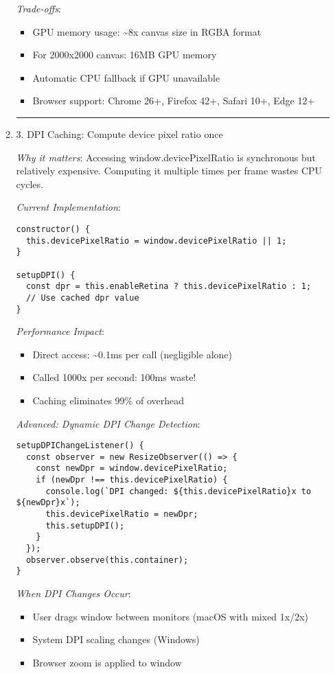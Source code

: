 \documentclass[11pt]{article}
\begin{document}
\begin{enumerate}
\begin{enumerate}
\emph{Trade-offs}:
\begin{itemize}
\item GPU memory usage: \textasciitilde{}8x canvas size in RGBA format
\item For 2000x2000 canvas: 16MB GPU memory
\item Automatic CPU fallback if GPU unavailable
\item Browser support: Chrome 26+, Firefox 42+, Safari 10+, Edge 12+
\end{itemize}

\noindent\rule{\textwidth}{0.5pt}
\item 3. DPI Caching: Compute device pixel ratio once
\label{sec:org31f8089}

\emph{Why it matters}: Accessing window.devicePixelRatio is synchronous but relatively expensive. Computing it multiple times per frame wastes CPU cycles.

\emph{Current Implementation}:
\begin{verbatim}
constructor() {
  this.devicePixelRatio = window.devicePixelRatio || 1;
}

setupDPI() {
  const dpr = this.enableRetina ? this.devicePixelRatio : 1;
  // Use cached dpr value
}
\end{verbatim}

\emph{Performance Impact}:
\begin{itemize}
\item Direct access: \textasciitilde{}0.1ms per call (negligible alone)
\item Called 1000x per second: 100ms waste!
\item Caching eliminates 99\% of overhead
\end{itemize}

\emph{Advanced: Dynamic DPI Change Detection}:
\begin{verbatim}
setupDPIChangeListener() {
  const observer = new ResizeObserver(() => {
    const newDpr = window.devicePixelRatio;
    if (newDpr !== this.devicePixelRatio) {
      console.log(`DPI changed: ${this.devicePixelRatio}x to ${newDpr}x`);
      this.devicePixelRatio = newDpr;
      this.setupDPI();
    }
  });
  observer.observe(this.container);
}
\end{verbatim}

\emph{When DPI Changes Occur}:
\begin{itemize}
\item User drags window between monitors (macOS with mixed 1x/2x)
\item System DPI scaling changes (Windows)
\item Browser zoom is applied to window
\end{itemize}


\end{enumerate}
\end{enumerate}
\end{document}
